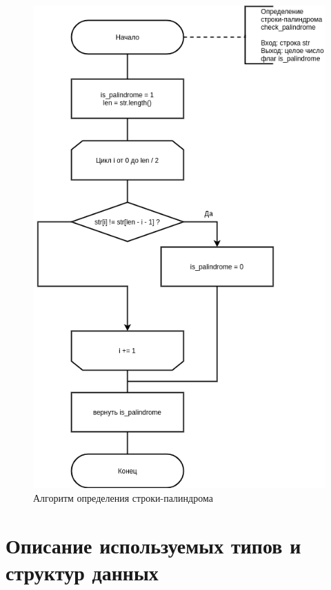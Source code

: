 \begin{figure}[H]
	\begin{center}
		\includegraphics[scale=0.6]{img/palindrome.png}
	\end{center}
	\captionsetup{justification=centering}
	\caption{Алгоритм определения строки-палиндрома}
	\label{img:palindrome}
\end{figure}

\section{Описание используемых типов и структур данных}

